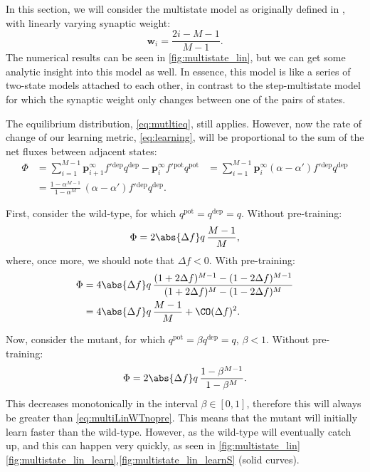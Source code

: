 \documentclass[12pt]{article}
\newcommand{\pr}{\mathbf{p}}
\newcommand{\eq}{\pr^\infty}
\newcommand{\w}{\mathbf{w}}
\newcommand{\pot}{^{\text{pot}}}
\newcommand{\dep}{^{\text{dep}}}
\begin{document}


In this section, we will consider the multistate model as originally defined in \cite{amit1994learning}, \ie with linearly varying synaptic weight:
%
\begin{equation}\label{eq:multistateLinWeight}
  \w_i = \frac{2i-M-1}{M-1}.
\end{equation}
%
The numerical results can be seen in \autoref{fig:multistate_lin}, but we can get some analytic insight into this model as well.
In essence, this model is like a series of two-state models attached to each other, in contrast to the step-multistate model for which the synaptic weight only changes between one of the pairs of states.


The equilibrium distribution, \eqref{eq:mutltieq}, still applies.
However, now the rate of change of our learning metric, \eqref{eq:learning}, will be proportional to the sum of the net fluxes between adjacent states:
%
\begin{equation}\label{eq:multiLinFlux}
  \begin{aligned}
    \Phi &= \sum_{i=1}^{M-1} \eq_{i+1} f'{}\dep q\dep - \eq_i f'{}\pot q\pot
         &= \sum_{i=1}^{M-1} \eq_i (\alpha-\alpha') f'{}\dep q\dep \\
         &= \frac{1-\alpha^{M-1}}{1-\alpha^M} \, (\alpha-\alpha') f'{}\dep q\dep.
  \end{aligned}
\end{equation}
%

First, consider the wild-type, for which $q\pot=q\dep=q$.
Without pre-training:
%
\begin{equation}\label{eq:multiLinWTnopre}
  \Phi = 2\abs{\Delta f}q\,\frac{M-1}{M},
\end{equation}
%
where, once more, we should note that $\Delta f<0$.
With pre-training:
%
\begin{equation}\label{eq:multiLinWTpre}
\begin{aligned}
  \Phi &= 4\abs{\Delta f} q \, \frac{(1+2\Delta f)^{M-1} - (1-2\Delta f)^{M-1}}
          {(1+2\Delta f)^M - (1-2\Delta f)^M} \\
       &= {4\abs{\Delta f} q}\,\frac{M-1}{M} + \CO(\Delta f)^2.
\end{aligned}
\end{equation}
%

Now, consider the mutant, for which $q\pot=\beta q\dep=q$, $\beta<1$.
Without pre-training:
%
\begin{equation}\label{eq:multiLinKOnopre}
  \Phi = 2\abs{\Delta f} q\,\frac{1-\beta^{M-1}}{1-\beta^M}.
\end{equation}
%
This decreases monotonically in the interval $\beta\in[0,1]$, therefore this will always be greater than \eqref{eq:multiLinWTnopre}.
This means that the mutant will initially learn faster than the wild-type.
However, as the wild-type will eventually catch up, and this can happen very quickly, as seen in \autoref{fig:multistate_lin}\ref{fig:multistate_lin_learn},\ref{fig:multistate_lin_learnS} (solid curves).
\end{document}
